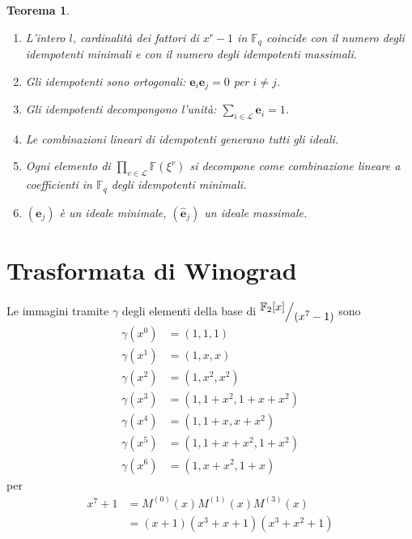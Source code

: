 \documentclass[mathserif]{beamer}
\def\quotient#1#2{%
   \raise1ex\hbox{$#1$}\Big/\lower1ex\hbox{$#2$}%
}
\newtheorem{teorema}{Teorema}
\begin{document}
\begin{frame}
\begin{teorema}
   \begin{enumerate}
      \item L'intero $l$, cardinalità dei fattori di $x^r-1$ in $\mathbb{F}_{q}$ coincide con il numero degli idempotenti minimali e con il numero degli idempotenti massimali.
      \item Gli idempotenti sono ortogonali: $\mathbf{e}_{i}\mathbf{e}_{j}  = \mathfrak{0}$ per $i \neq j$.
      \item Gli idempotenti decompongono l'unità: $\sum_{i \in \mathscr{L}}\mathbf{e}_{i}  = \mathfrak{1}$.
      \item Le combinazioni lineari di idempotenti generano tutti gli ideali.
      \item Ogni elemento di $ \prod_{v\in \mathscr{L}} \mathbb{F}(\xi^{v})$ si decompone come combinazione lineare a coefficienti in $\mathbb{F}_{q}$ degli idempotenti minimali.
      \item $(\mathbf{e}_{j})$ è un ideale minimale, $(\mathbf{\hat{e}}_{j})$ un ideale massimale.
   \end{enumerate}
\end{teorema}
\end{frame}


\section{Trasformata di Winograd}

\thispagestyle{empty}
\begin{frame}
   \vspace{-1.2cm}
    Le immagini tramite $\gamma$ degli elementi della base di $ \quotient{\mathbb{F}_{2} \lbrack x \rbrack  }{ (x^{7} - 1)}$ sono
    \begin{align*}
      \gamma(x^0) &= (1,1,1)  \\
      \gamma(x^1) &= (1,x,x) \\
      \gamma(x^2) &= (1,x^2,x^2)  \\
      \gamma(x^3) &= (1,1+x^2,1+x+x^2)  \\
      \gamma(x^4) &= (1,1+x,x+x^2)  \\
      \gamma(x^5) &= (1,1+x+x^2,1+x^2)  \\
      \gamma(x^6) &= (1,x+x^2,1+x)
    \end{align*}
    per
    \begin{align*}
      x^{7} + 1 &= M^{(0)}(x) M^{(1)}(x) M^{(3)}(x) \\
		&= (x+1)(x^3 + x + 1)(x^3 + x^2 + 1)
    \end{align*}
\end{frame}
\end{document}

